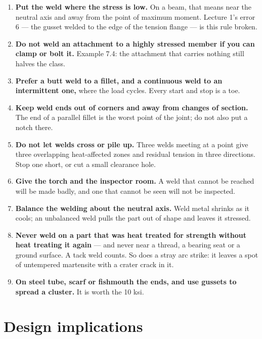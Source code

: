 \documentclass[11pt,a4paper]{article}
\begin{document}
\begin{enumerate}[leftmargin=*,itemsep=3pt]
\item \textbf{Put the weld where the stress is low.} On a beam, that means near the neutral axis
  and away from the point of maximum moment. Lecture 1's error 6 --- the gusset welded to the edge
  of the tension flange --- is this rule broken.
\item \textbf{Do not weld an attachment to a highly stressed member if you can clamp or bolt it.}
  Example 7.4: the attachment that carries nothing still halves the class.
\item \textbf{Prefer a butt weld to a fillet, and a continuous weld to an intermittent one,} where
  the load cycles. Every start and stop is a toe.
\item \textbf{Keep weld ends out of corners and away from changes of section.} The end of a
  parallel fillet is the worst point of the joint; do not also put a notch there.
\item \textbf{Do not let welds cross or pile up.} Three welds meeting at a point give three
  overlapping heat-affected zones and residual tension in three directions. Stop one short, or
  cut a small clearance hole.
\item \textbf{Give the torch and the inspector room.} A weld that cannot be reached will be made
  badly, and one that cannot be seen will not be inspected.
\item \textbf{Balance the welding about the neutral axis.} Weld metal shrinks as it cools; an
  unbalanced weld pulls the part out of shape and leaves it stressed.
\item \textbf{Never weld on a part that was heat treated for strength without heat treating it
  again} --- and never near a thread, a bearing seat or a ground surface. A tack weld counts. So
  does a stray arc strike: it leaves a spot of untempered martensite with a crater crack in it.
\item \textbf{On steel tube, scarf or fishmouth the ends, and use gussets to spread a cluster.}
  It is worth the 10 ksi.
\end{enumerate}

\section{Design implications}
\end{document}
